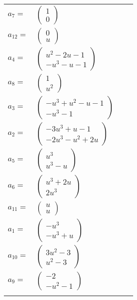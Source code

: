\documentclass[1p]{elsarticle_modified}
\theoremstyle{definition}
\begin{document}
\begin{tabular}{m{7pt} m{180pt} m{7pt} m{180pt} }
\flushright $a_{7}=$&$\begin{pmatrix}1\\0\end{pmatrix}$ \\
\flushright $a_{12}=$&$\begin{pmatrix}0\\u\end{pmatrix}$ \\
\flushright $a_{4}=$&$\begin{pmatrix}u^2-2 u-1\\- u^3- u-1\end{pmatrix}$ \\
\flushright $a_{8}=$&$\begin{pmatrix}1\\u^2\end{pmatrix}$ \\
\flushright $a_{3}=$&$\begin{pmatrix}- u^3+u^2- u-1\\- u^3-1\end{pmatrix}$ \\
\flushright $a_{2}=$&$\begin{pmatrix}-3 u^3+u-1\\-2 u^3- u^2+2 u\end{pmatrix}$ \\
\flushright $a_{5}=$&$\begin{pmatrix}u^3\\u^3- u\end{pmatrix}$ \\
\flushright $a_{6}=$&$\begin{pmatrix}u^3+2 u\\2 u^3\end{pmatrix}$ \\
\flushright $a_{11}=$&$\begin{pmatrix}u\\u\end{pmatrix}$ \\
\flushright $a_{1}=$&$\begin{pmatrix}- u^3\\- u^3+u\end{pmatrix}$ \\
\flushright $a_{10}=$&$\begin{pmatrix}3 u^2-3\\u^2-3\end{pmatrix}$ \\
\flushright $a_{9}=$&$\begin{pmatrix}-2\\- u^2-1\end{pmatrix}$\\&\end{tabular}
\end{document}
